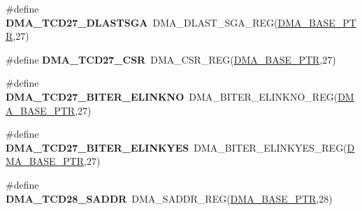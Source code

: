 \begin{DoxyCompactItemize}
\item 
\hypertarget{group___d_m_a___register___accessor___macros_ga07534e140aba0591b89e9fe4314d03f8}{}\#define {\bfseries D\+M\+A\+\_\+\+T\+C\+D27\+\_\+\+D\+L\+A\+S\+T\+S\+G\+A}~D\+M\+A\+\_\+\+D\+L\+A\+S\+T\+\_\+\+S\+G\+A\+\_\+\+R\+E\+G(\hyperlink{group___d_m_a___peripheral_ga6997fbc1b1973e9f27170217a3bd6f22}{D\+M\+A\+\_\+\+B\+A\+S\+E\+\_\+\+P\+T\+R},27)\label{group___d_m_a___register___accessor___macros_ga07534e140aba0591b89e9fe4314d03f8}

\item 
\hypertarget{group___d_m_a___register___accessor___macros_gacd60c3887b3ae74535b32f9b64f9595a}{}\#define {\bfseries D\+M\+A\+\_\+\+T\+C\+D27\+\_\+\+C\+S\+R}~D\+M\+A\+\_\+\+C\+S\+R\+\_\+\+R\+E\+G(\hyperlink{group___d_m_a___peripheral_ga6997fbc1b1973e9f27170217a3bd6f22}{D\+M\+A\+\_\+\+B\+A\+S\+E\+\_\+\+P\+T\+R},27)\label{group___d_m_a___register___accessor___macros_gacd60c3887b3ae74535b32f9b64f9595a}

\item 
\hypertarget{group___d_m_a___register___accessor___macros_gaad3dd99e9bec1d5921f133a1141cb2d4}{}\#define {\bfseries D\+M\+A\+\_\+\+T\+C\+D27\+\_\+\+B\+I\+T\+E\+R\+\_\+\+E\+L\+I\+N\+K\+N\+O}~D\+M\+A\+\_\+\+B\+I\+T\+E\+R\+\_\+\+E\+L\+I\+N\+K\+N\+O\+\_\+\+R\+E\+G(\hyperlink{group___d_m_a___peripheral_ga6997fbc1b1973e9f27170217a3bd6f22}{D\+M\+A\+\_\+\+B\+A\+S\+E\+\_\+\+P\+T\+R},27)\label{group___d_m_a___register___accessor___macros_gaad3dd99e9bec1d5921f133a1141cb2d4}

\item 
\hypertarget{group___d_m_a___register___accessor___macros_gabe7bedb295e67a118829b7a4347d8a18}{}\#define {\bfseries D\+M\+A\+\_\+\+T\+C\+D27\+\_\+\+B\+I\+T\+E\+R\+\_\+\+E\+L\+I\+N\+K\+Y\+E\+S}~D\+M\+A\+\_\+\+B\+I\+T\+E\+R\+\_\+\+E\+L\+I\+N\+K\+Y\+E\+S\+\_\+\+R\+E\+G(\hyperlink{group___d_m_a___peripheral_ga6997fbc1b1973e9f27170217a3bd6f22}{D\+M\+A\+\_\+\+B\+A\+S\+E\+\_\+\+P\+T\+R},27)\label{group___d_m_a___register___accessor___macros_gabe7bedb295e67a118829b7a4347d8a18}

\item 
\hypertarget{group___d_m_a___register___accessor___macros_gafaa278e41ec168b8d6f113fbd81579e9}{}\#define {\bfseries D\+M\+A\+\_\+\+T\+C\+D28\+\_\+\+S\+A\+D\+D\+R}~D\+M\+A\+\_\+\+S\+A\+D\+D\+R\+\_\+\+R\+E\+G(\hyperlink{group___d_m_a___peripheral_ga6997fbc1b1973e9f27170217a3bd6f22}{D\+M\+A\+\_\+\+B\+A\+S\+E\+\_\+\+P\+T\+R},28)\label{group___d_m_a___register___accessor___macros_gafaa278e41ec168b8d6f113fbd81579e9}


\end{DoxyCompactItemize}
